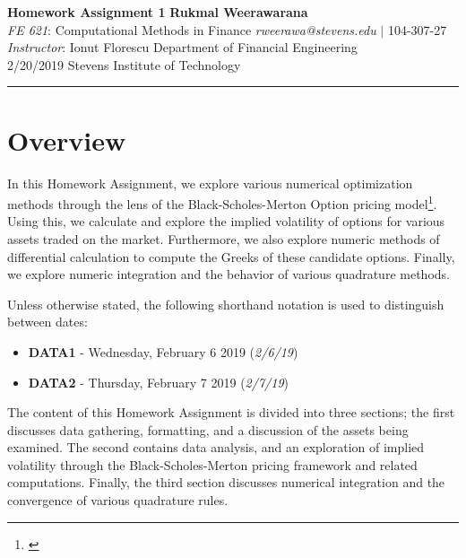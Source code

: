 \documentclass[10pt]{article}
\begin{document}
\thispagestyle{plain}



\noindent
\large\textbf{Homework Assignment 1} \hfill \textbf{Rukmal Weerawarana} \\
\normalsize \textit{FE 621}: Computational Methods in Finance \hfill \textit{rweerawa@stevens.edu} $\mid$ 104-307-27 \\
\textit{Instructor}: Ionut Florescu \hfill Department of Financial Engineering \\
2/20/2019 \hfill Stevens Institute of Technology

\noindent\rule{\linewidth}{.1em}



\section*{Overview}

In this Homework Assignment, we explore various numerical optimization methods through the lens of the Black-Scholes-Merton Option pricing model\footnote{\cite{Shreve2004}}. Using this, we calculate and explore the implied volatility of options for various assets traded on the market. Furthermore, we also explore numeric methods of differential calculation to compute the Greeks of these candidate options. Finally, we explore numeric integration and the behavior of various quadrature methods.

Unless otherwise stated, the following shorthand notation is used to distinguish between dates:

\begin{itemize}
    \item \textbf{DATA1} - Wednesday, February 6 2019 (\textit{2/6/19})
    \item \textbf{DATA2} - Thursday, February 7 2019 (\textit{2/7/19})
\end{itemize}

The content of this Homework Assignment is divided into three sections; the first discusses data gathering, formatting, and a discussion of the assets being examined. The second contains data analysis, and an exploration of implied volatility through the Black-Scholes-Merton pricing framework and related computations. Finally, the third section discusses numerical integration and the convergence of various quadrature rules.
\end{document}
